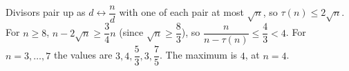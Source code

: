 Divisors pair up as $d\leftrightarrow\dfrac nd$ with one of each pair at most $\sqrt n$, so $\tau(n)\le2\sqrt n$. For $n\ge8$, $n-2\sqrt n\ge\dfrac34n$ (since $\sqrt n\ge\dfrac83$), so $\dfrac n{n-\tau(n)}\le\dfrac43<4$. For $n=3,\dots,7$ the values are $3,4,\dfrac53,3,\dfrac75$. The maximum is $\boxed{4}$, at $n=4$.
